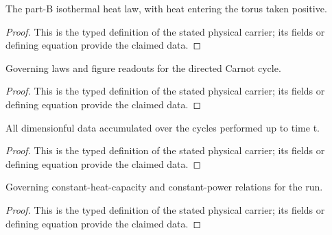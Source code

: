 \begin{definition}
  \label{def:physics:IPhO_2026_3_C_5:aux016}
  The part-B isothermal heat law, with heat entering the torus taken positive.
\end{definition}
\begin{proof}
  This is the typed definition of the stated physical carrier; its fields or defining equation provide the claimed data.
\end{proof}

\begin{definition}
  \label{def:physics:IPhO_2026_3_C_5:aux017}
  Governing laws and figure readouts for the directed Carnot cycle.
\end{definition}
\begin{proof}
  This is the typed definition of the stated physical carrier; its fields or defining equation provide the claimed data.
\end{proof}

\begin{definition}
  \label{def:physics:IPhO_2026_3_C_5:aux018}
  All dimensionful data accumulated over the cycles performed up to time t.
\end{definition}
\begin{proof}
  This is the typed definition of the stated physical carrier; its fields or defining equation provide the claimed data.
\end{proof}

\begin{definition}
  \label{def:physics:IPhO_2026_3_C_5:aux019}
  Governing constant-heat-capacity and constant-power relations for the run.
\end{definition}
\begin{proof}
  This is the typed definition of the stated physical carrier; its fields or defining equation provide the claimed data.
\end{proof}

